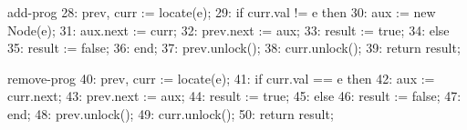\newcommand{\LocateBody}{
\begin{algorithmic}[1]
\State $\prev := \Head$
\State $\prev.\lock()$
\State $\curr := \prev.\tNext$
\State $\curr.lock()$
\While {$\curr.\val < e$}
	\State $\prev.\unlock()$
	\State $\prev := \curr$
	\State $\curr := \curr.\tNext$
	\State $\curr.\lock()$
\EndWhile
\State \tbf{return} $(\prev, \curr)$
\Statex
\end{algorithmic}
}

\newcommand{\LocatePrg}{
  \begin{minipage}[c]{3.7cm}
    \LocateBody
  \end{minipage}
}

\newcommand{\LocateFig}{
\begin{minipage}[c]{3.7cm}
  \LocateBody
\label{fig:locate}
\end{minipage}
}

%
%
\begin{SaveVerbatim}{add-prog}
28:  prev, curr := locate(e);
29:  if curr.val != e then
30:      aux := new Node(e);
31:      aux.next := curr;
32:      prev.next := aux;
33:      result := true;
34:  else
35:      result := false;
36:  end;
37:  prev.unlock();
38:  curr.unlock();
39:  return result;
\end{SaveVerbatim}



\newcommand{\AddBody}{
\begin{algorithmic}[1]
\State $\prev, \curr := \locate(e)$
\If {$\curr.\val \neq e$}
	\State $\aux := \New \Node(e)$
	\State $\aux.\tNext := \curr$
	\State $\prev.\tNext := \aux$
	\State $\result := \true$
\Else
	\State $\result := \false$
\EndIf
\State $\prev.\unlock()$
\State $\curr.\unlock()$
\State \tbf{return} $\result$
\end{algorithmic}
}

\newcommand{\AddPrg}{
  \begin{minipage}[c]{4.1cm}
    \AddBody
  \end{minipage}
}

\newcommand{\AddFig}{
\begin{minipage}[c]{4.1cm}
  \AddBody
  \label{fig:add}
\end{minipage}
}

%
%
\begin{SaveVerbatim}{remove-prog}
40:  prev, curr := locate(e);
41:  if curr.val == e then
42:      aux := curr.next;
43:      prev.next := aux;
44:      result := true;
45:  else
46:      result := false;
47:  end;
48:  prev.unlock();
49:  curr.unlock();
50:  return result;
\end{SaveVerbatim}


